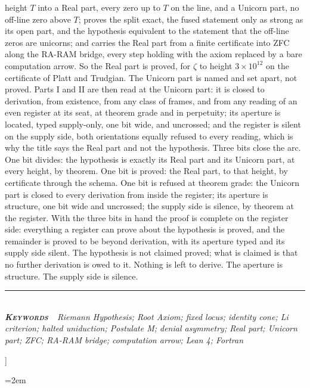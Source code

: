 \documentclass[10pt,twocolumn]{article}
\begin{document}
{\begin{minipage}{\textwidth}
{height \(T\) into a Real part, every zero up to \(T\) on the line, and a
Unicorn part, no off-line zero above \(T\); proves the split exact, the
fused statement only as strong as its open part, and the hypothesis
equivalent to the statement that the off-line zeros are unicorns; and
carries the Real part from a finite certificate into ZFC along the
RA-RAM bridge, every step holding with the axiom replaced by a bare
computation arrow. So the Real part is proved, for \(\zeta\) to height
\(3 \times 10^{12}\) on the certificate of Platt and Trudgian. The
Unicorn part is named and set apart, not proved. Parts I and II are then
read at the Unicorn part: it is closed to derivation, from existence,
from any class of frames, and from any reading of an even register at
its seat, at theorem grade and in perpetuity; its aperture is located,
typed supply-only, one bit wide, and uncrossed; and the register is
silent on the supply side, both orientations equally refused to every
reading, which is why the title says the Real part and not the
hypothesis. Three bits close the arc. One bit divides: the hypothesis is
exactly its Real part and its Unicorn part, at every height, by theorem.
One bit is proved: the Real part, to that height, by certificate through
the schema. One bit is refused at theorem grade: the Unicorn part is
closed to every derivation from inside the register; its aperture is
structure, one bit wide and uncrossed; the supply side is silence, by
theorem at the register. With the three bits in hand the proof is
complete on the register side: everything a register can prove about the
hypothesis is proved, and the remainder is proved to be beyond
derivation, with its aperture typed and its supply side silent. The
hypothesis is not claimed proved; what is claimed is that no further
derivation is owed to it. Nothing is left to derive. The aperture is
structure. The supply side is silence.}\\[4pt]
{\color{accent}\rule{\textwidth}{0.6pt}}\\[3pt]
{\itshape\footnotesize\color{faint}\textbf{\upshape\scshape\color{deep}Keywords\ }\ Riemann
Hypothesis; Root Axiom; fixed locus; identity cone; Li criterion; halted
uniduction; Postulate M; denial asymmetry; Real part; Unicorn part; ZFC;
RA-RAM bridge; computation arrow; Lean 4; Fortran}\\[12pt]
\end{minipage}
}]
\thispagestyle{fancy}
\let\oldunderscore\_\renewcommand{\_}{\oldunderscore\allowbreak}

\emergencystretch=2em
\end{document}
